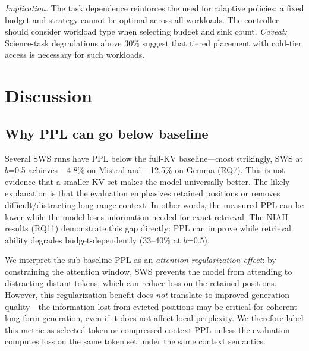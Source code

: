 \documentclass[11pt]{article}
\newcommand{\sws}{SWS}
\newcommand{\pct}{\%}
\theoremstyle{definition}
\theoremstyle{plain}
\begin{document}
\emph{Implication.}  The task dependence reinforces the need for adaptive policies: a fixed budget and strategy cannot be optimal across all workloads.  The controller should consider workload type when selecting budget and sink count.  \emph{Caveat:} Science-task degradations above 30\pct{} suggest that tiered placement with cold-tier access is necessary for such workloads.

\section{Discussion}
\label{sec:discussion}

\subsection{Why PPL can go below baseline}
Several \sws{} runs have PPL below the full-KV baseline---most strikingly, \sws{} at $b$=0.5 achieves $-$4.8\pct{} on Mistral and $-$12.5\pct{} on Gemma (RQ7).  This is not evidence that a smaller KV set makes the model universally better.  The likely explanation is that the evaluation emphasizes retained positions or removes difficult/distracting long-range context.  In other words, the measured PPL can be lower while the model loses information needed for exact retrieval.  The NIAH results (RQ11) demonstrate this gap directly: PPL can improve while retrieval ability degrades budget-dependently (33--40\pct{} at $b$=0.5).

We interpret the sub-baseline PPL as an \emph{attention regularization effect}: by constraining the attention window, \sws{} prevents the model from attending to distracting distant tokens, which can reduce loss on the retained positions.  However, this regularization benefit does \emph{not} translate to improved generation quality---the information lost from evicted positions may be critical for coherent long-form generation, even if it does not affect local perplexity.  We therefore label this metric as selected-token or compressed-context PPL unless the evaluation computes loss on the same token set under the same context semantics.
\end{document}
